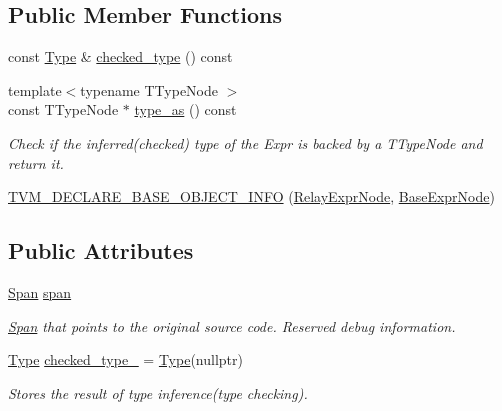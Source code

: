\subsection*{Public Member Functions}
\begin{DoxyCompactItemize}
\item 
const \hyperlink{classtvm_1_1Type}{Type} \& \hyperlink{classtvm_1_1RelayExprNode_a89bfd23e109a842d18240277ffaaa130}{checked\+\_\+type} () const 
\item 
{\footnotesize template$<$typename T\+Type\+Node $>$ }\\const T\+Type\+Node $\ast$ \hyperlink{classtvm_1_1RelayExprNode_a60c73bac632a728a2a669bb34a1c3008}{type\+\_\+as} () const 
\begin{DoxyCompactList}\small\item\em Check if the inferred(checked) type of the Expr is backed by a T\+Type\+Node and return it. \end{DoxyCompactList}\item 
\hyperlink{classtvm_1_1RelayExprNode_a89eb638258551ea1ae2d0e578335474a}{T\+V\+M\+\_\+\+D\+E\+C\+L\+A\+R\+E\+\_\+\+B\+A\+S\+E\+\_\+\+O\+B\+J\+E\+C\+T\+\_\+\+I\+N\+FO} (\hyperlink{classtvm_1_1RelayExprNode}{Relay\+Expr\+Node}, \hyperlink{classtvm_1_1BaseExprNode}{Base\+Expr\+Node})
\end{DoxyCompactItemize}
\subsection*{Public Attributes}
\begin{DoxyCompactItemize}
\item 
\hyperlink{classtvm_1_1Span}{Span} \hyperlink{classtvm_1_1RelayExprNode_a904ae50be0b72eab079bed93829c9563}{span}
\begin{DoxyCompactList}\small\item\em \hyperlink{classtvm_1_1Span}{Span} that points to the original source code. Reserved debug information. \end{DoxyCompactList}\item 
\hyperlink{classtvm_1_1Type}{Type} \hyperlink{classtvm_1_1RelayExprNode_ae30ca49a8b84288fbc21d5f312f02929}{checked\+\_\+type\+\_\+} = \hyperlink{classtvm_1_1Type}{Type}(nullptr)
\begin{DoxyCompactList}\small\item\em Stores the result of type inference(type checking). \end{DoxyCompactList}\end{DoxyCompactItemize}
